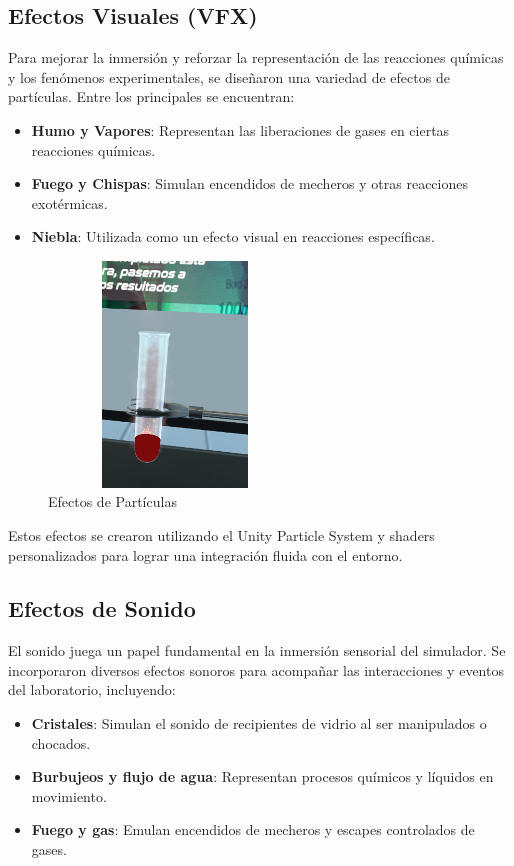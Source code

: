 \subsection{Efectos Visuales (VFX)}
Para mejorar la inmersión y reforzar la representación de las reacciones químicas y los fenómenos experimentales, se diseñaron una variedad de efectos de partículas. Entre los principales se encuentran:
\begin{itemize}
    \item \textbf{Humo y Vapores}: Representan las liberaciones de gases en ciertas reacciones químicas.
    \item \textbf{Fuego y Chispas}: Simulan encendidos de mecheros y otras reacciones exotérmicas.
    \item \textbf{Niebla}: Utilizada como un efecto visual en reacciones específicas.
\end{itemize}
\begin{figure}[thbp]
    \centering
    \includegraphics[width=0.6\textwidth, height = 6cm]{img/chapter04/VFX.png}
    \caption{Efectos de Partículas}
    \label{fig:Diversos_Efectos_Visuales}
\end{figure}
Estos efectos se crearon utilizando el Unity Particle System y shaders personalizados para lograr una integración fluida con el entorno.

\subsection{Efectos de Sonido}
El sonido juega un papel fundamental en la inmersión sensorial del simulador. Se incorporaron diversos efectos sonoros para acompañar las interacciones y eventos del laboratorio, incluyendo:
\begin{itemize}
    \item \textbf{Cristales}: Simulan el sonido de recipientes de vidrio al ser manipulados o chocados.
    \item \textbf{Burbujeos y flujo de agua}: Representan procesos químicos y líquidos en movimiento.
    \item \textbf{Fuego y gas}: Emulan encendidos de mecheros y escapes controlados de gases.
\end{itemize}


